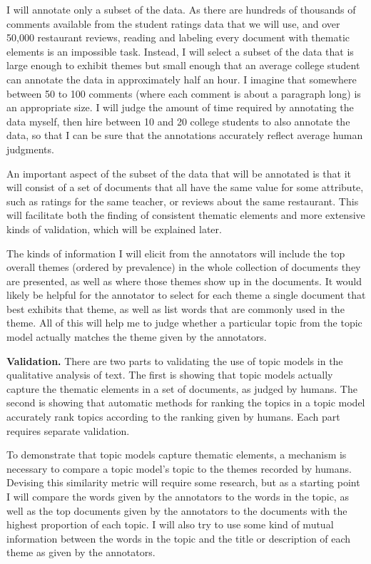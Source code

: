 \documentclass[onecolumn, 12pt]{article}
\begin{document}
I will annotate only a subset of the data.  As there are hundreds of thousands
of comments available from the student ratings data that we will use, and over
50,000 restaurant reviews, reading and labeling every document with thematic
elements is an impossible task.  Instead, I will select a subset of the data
that is large enough to exhibit themes but small enough that an average college
student can annotate the data in approximately half an hour.  I imagine that
somewhere between 50 to 100 comments (where each comment is about a paragraph
long) is an appropriate size.  I will judge the amount of time required by
annotating the data myself, then hire between 10 and 20 college students to
also annotate the data, so that I can be sure that the annotations accurately
reflect average human judgments.  

An important aspect of the subset of the data that will be annotated is
that it will consist of a set of documents that all have the same value for
some attribute, such as ratings for the same teacher, or reviews about the same
restaurant.  This will facilitate both the finding of consistent thematic
elements and more extensive kinds of validation, which will be explained later.

The kinds of information I will elicit from the annotators will include the
top overall themes (ordered by prevalence) in the whole collection of documents
they are presented, as well as where those themes show up in the documents.  It
would likely be helpful for the annotator to select for each theme a single
document that best exhibits that theme, as well as list words that are commonly
used in the theme.  All of this will help me to judge whether a particular
topic from the topic model actually matches the theme given by the annotators.

\textbf{Validation.}  There are two parts to validating the use of topic models
in the qualitative analysis of text.  The first is showing that topic models
actually capture the thematic elements in a set of documents, as judged by
humans.  The second is showing that automatic methods for ranking the topics in
a topic model accurately rank topics according to the ranking given by humans.
Each part requires separate validation.

To demonstrate that topic models capture thematic elements, a mechanism is
necessary to compare a topic model's topic to the themes recorded by humans.
Devising this similarity metric will require some research, but as a starting
point I will compare the words given by the annotators to the words in the
topic, as well as the top documents given by the annotators to the documents
with the highest proportion of each topic.  I will also try to use some kind
of mutual information between the words in the topic and the title or
description of each theme as given by the annotators.
\end{document}
